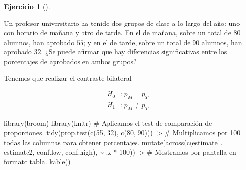 \documentclass[
  a4paper,
]{scrreport}
\newenvironment{Shaded}{\begin{snugshade}}{\end{snugshade}}
\newcommand{\CommentTok}[1]{\textcolor[rgb]{0.37,0.37,0.37}{#1}}
\newcommand{\DecValTok}[1]{\textcolor[rgb]{0.68,0.00,0.00}{#1}}
\newcommand{\FunctionTok}[1]{\textcolor[rgb]{0.28,0.35,0.67}{#1}}
\newcommand{\NormalTok}[1]{\textcolor[rgb]{0.00,0.23,0.31}{#1}}
\newcommand{\SpecialCharTok}[1]{\textcolor[rgb]{0.37,0.37,0.37}{#1}}
\theoremstyle{definition}
\newtheorem{exercise}{Ejercicio}[chapter]
\theoremstyle{remark}
\begin{document}
\begin{exercise}[]\protect\hypertarget{exr-contraste-hipotesis-proporciones-aprobados}{}\label{exr-contraste-hipotesis-proporciones-aprobados}

Un profesor universitario ha tenido dos grupos de clase a lo largo del
año: uno con horario de mañana y otro de tarde. En el de mañana, sobre
un total de \(80\) alumnos, han aprobado \(55\); y en el de tarde, sobre
un total de \(90\) alumnos, han aprobado \(32\). ¿Se puede afirmar que
hay diferencias significativas entre los porcentajes de aprobados en
ambos grupos?

\begin{tcolorbox}[enhanced jigsaw, breakable, toptitle=1mm, colbacktitle=quarto-callout-tip-color!10!white, rightrule=.15mm, opacityback=0, opacitybacktitle=0.6, titlerule=0mm, coltitle=black, colframe=quarto-callout-tip-color-frame, colback=white, bottomtitle=1mm, leftrule=.75mm, toprule=.15mm, title=\textcolor{quarto-callout-tip-color}{\faLightbulb}\hspace{0.5em}{Solución}, arc=.35mm, bottomrule=.15mm, left=2mm]

Tenemos que realizar el contraste bilateral

\begin{align*}
H_0 &: p_M = p_T \\
H_1 &: p_M \neq p_T 
\end{align*}

\begin{Shaded}
\begin{Highlighting}[]
\FunctionTok{library}\NormalTok{(broom)}
\FunctionTok{library}\NormalTok{(knitr) }
\CommentTok{\# Aplicamos el test de comparación de proporciones.}
\FunctionTok{tidy}\NormalTok{(}\FunctionTok{prop.test}\NormalTok{(}\FunctionTok{c}\NormalTok{(}\DecValTok{55}\NormalTok{, }\DecValTok{32}\NormalTok{), }\FunctionTok{c}\NormalTok{(}\DecValTok{80}\NormalTok{, }\DecValTok{90}\NormalTok{))) }\SpecialCharTok{|\textgreater{}} 
    \CommentTok{\# Multiplicamos por 100 todas las columnas para obtener porcentajes.}
    \FunctionTok{mutate}\NormalTok{(}\FunctionTok{across}\NormalTok{(}\FunctionTok{c}\NormalTok{(estimate1, estimate2, conf.low, conf.high), }\SpecialCharTok{\textasciitilde{}}\NormalTok{ .x }\SpecialCharTok{*} \DecValTok{100}\NormalTok{)) }\SpecialCharTok{|\textgreater{}} 
    \CommentTok{\# Mostramos por pantalla en formato tabla.}
    \FunctionTok{kable}\NormalTok{()}
\end{Highlighting}
\end{Shaded}


\end{tcolorbox}
\end{exercise}
\end{document}
